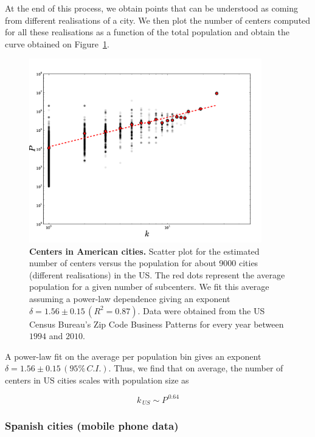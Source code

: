 At the end of this process, we obtain points that can be understood as coming
from different realisations of a city. We then plot the number of centers
computed for all these realisations as a function of the total population and
obtain the curve obtained on Figure~\ref{fig:us_centers}.

\begin{figure}
    \centering
    \includegraphics[width=0.9\textwidth]{gfx/chapter-monocentric/5.png}
    \caption{{\bf Centers in American cities.} Scatter plot for the estimated number of centers versus the
    population for about 9000 cities (different realisations) in the US. The red
dots represent the average population for a given number of subcenters. We fit
this average assuming a power-law dependence giving an exponent $\delta = 1.56
    \pm 0.15\,(R^2=0.87)$. Data were obtained from the US Census Bureau's Zip
Code Business Patterns for every year between $1994$ and $2010$. \label{fig:us_centers}}
\end{figure}


A power-law fit on the average per population bin gives an exponent $\delta =
1.56 \pm 0.15\,(95\%\,C.I.)$. Thus, we find that on average, the number of
centers in US cities scales with population size as

\begin{equation}
    k_{\,US} \sim P^{\,0.64}
\end{equation}

\subsubsection{Spanish cities (mobile phone data)}
\label{sub:spanish_cities_mobile_phone_data_}

